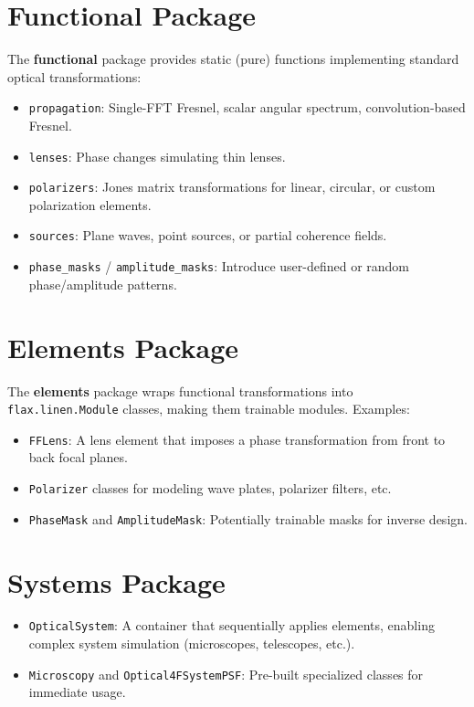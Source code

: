 \documentclass[a4paper,12pt]{report}
\begin{document}
\section{Functional Package}
The \textbf{functional} package provides static (pure) functions implementing standard optical transformations:
\begin{itemize}
    \item \texttt{propagation}: Single-FFT Fresnel, scalar angular spectrum, convolution-based Fresnel.
    \item \texttt{lenses}: Phase changes simulating thin lenses.
    \item \texttt{polarizers}: Jones matrix transformations for linear, circular, or custom polarization elements.
    \item \texttt{sources}: Plane waves, point sources, or partial coherence fields.
    \item \texttt{phase\_masks} / \texttt{amplitude\_masks}: Introduce user-defined or random phase/amplitude patterns.
\end{itemize}

\section{Elements Package}
The \textbf{elements} package wraps functional transformations into \texttt{flax.linen.Module} classes, making them trainable modules. Examples:
\begin{itemize}
    \item \texttt{FFLens}: A lens element that imposes a phase transformation from front to back focal planes.
    \item \texttt{Polarizer} classes for modeling wave plates, polarizer filters, etc.
    \item \texttt{PhaseMask} and \texttt{AmplitudeMask}: Potentially trainable masks for inverse design.
\end{itemize}

\section{Systems Package}
\begin{itemize}
    \item \texttt{OpticalSystem}: A container that sequentially applies elements, enabling complex system simulation (microscopes, telescopes, etc.).
    \item \texttt{Microscopy} and \texttt{Optical4FSystemPSF}: Pre-built specialized classes for immediate usage.
\end{itemize}
\end{document}
